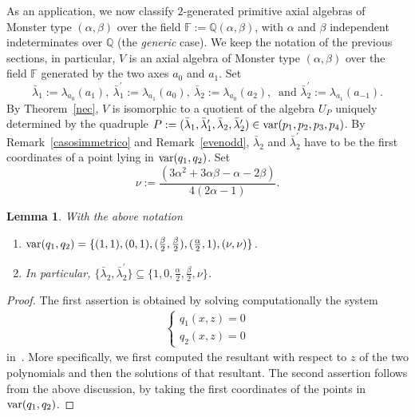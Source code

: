 \documentclass[a4paper]{amsart}
\newtheorem{lemma}{Lemma}[section]
\newcommand{\Var}{{\rm var}}
\newcommand{\Q}{{\mathbb Q}}
\newcommand{\F}{{\mathbb F}}
\newcommand{\al}{\alpha}
\newcommand{\bt}{\beta}
\begin{document}
As an application, we now classify $2$-generated primitive axial algebras of Monster type $(\al, \bt)$ over the field $\F:=\Q(\al, \bt)$, with $\al$ and $\bt$ independent indeterminates over $\Q$ (the {\it generic} case). We keep the notation of the previous sections, in particular, 
$V$ is an axial algebra of Monster type $(\al, \bt)$ over the field $\F$ generated by the two axes $a_0$ and $a_1$. Set
 $$
\bar \lambda_1:=\lambda_{a_0}(a_1), \:  \bar \lambda_1^\prime:=\lambda_{a_1}(a_0), \:
 \bar \lambda_2:=\lambda_{a_0}(a_2), \:\mbox{ and } \bar \lambda_2^\prime:=\lambda_{a_1}(a_{-1}). 
 $$
By Theorem~\ref{nec}, $V$ is isomorphic to a quotient of the algebra $U_P$ uniquely determined by the quadruple $P:= (\bar \lambda_1, \bar \lambda_1^\prime, \bar \lambda_2,  \bar \lambda_2^\prime)\in \Var(p_1, p_2, p_3, p_4)$.
By Remark~\ref{casosimmetrico} and  Remark~\ref{evenodd}, $\bar \lambda_2$ and   $\bar \lambda_2^\prime$ have to be the first coordinates of a point lying in $\Var(q_1, q_2)$. Set
$$
  \nu:= 
\frac{(3\al^2+3\al\bt-\al-2\bt)}{4(2\al-1)}.$$

\begin{lemma}\label{solutions}
With the above notation 
\begin{enumerate}
\item ${\Var} (q_1, q_2)=\{(1,1), (0,1), (\tfrac{\bt}{2}, \tfrac{\bt}{2}),(\tfrac{\al}{2}, 1 ), (\nu, \nu)\}$. 
\item In particular, 
$\{\bar \lambda_2, \bar \lambda_2^\prime\} \subseteq  \{ 1, 0, \tfrac{\al}{2}, \tfrac{\bt}{2}, \nu \}$. 
\end{enumerate}
\end{lemma}
\begin{proof}
The first assertion is obtained by solving computationally the system 
\begin{align*}
\left \{ \begin{array}{c}
q_1(x,z)=0\\
q_2(x,z)=0
\end{array}
\right .
\end{align*}
in~\cite[genericsakuma.s]{code}. More specifically, we first computed the resultant with respect to $z$ of the two polynomials and then the  solutions  of that resultant. The second assertion follows from the above discussion,  by taking the first coordinates of the points in ${\Var} (q_1, q_2)$.
\end{proof}
\end{document}
